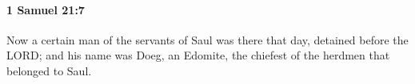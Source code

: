 
		\paragraph{1 Samuel 21:7} %
			\label{1SAMUEL-21-7}

			Now a certain man of the servants of Saul was there that day, detained before the LORD; and his name was Doeg, an Edomite, the chiefest of the herdmen that belonged to Saul.


